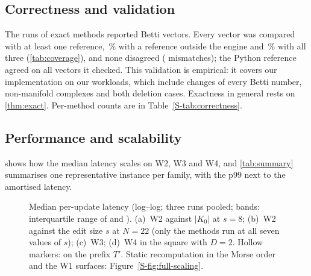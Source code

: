 \subsection{Correctness and validation}\label{sec:exp-correctness-results}

The \NumExactRuns{} runs of exact methods reported \NumCoverageVectors{} Betti
vectors. Every vector was compared with at least one reference,
\NumCoverageExternalPct\,\% with a reference outside the engine and
\NumCoverageAllThreePct\,\% with all three (\cref{tab:coverage}), and none
disagreed (\NumExactMismatches{} mismatches); the Python reference agreed on all
\NumReferenceChecks{} vectors it checked. This validation is empirical: it
covers our implementation on our workloads, which include changes of every
Betti number, non-manifold complexes and both deletion cases. Exactness in
general rests on \cref{thm:exact}. Per-method counts are in
Table~\ref{S-tab:correctness}.

\begin{table}[t]
  \centering
  \caption{Coverage of the correctness checks: Betti vectors reported by exact
    runs and the fractions compared with at least one, at least two and all
    three references (, closed form, GUDHI), and with at least
    one reference outside the engine. W4 has no closed form.}
  \label{tab:coverage}
  \small
  \setlength{\tabcolsep}{4pt}
\end{table}

\subsection{Performance and scalability}\label{sec:exp-performance}

 shows how the median latency scales on W2, W3 and W4, and
\cref{tab:summary} summarises one representative instance per family, with the
p99 next to the amortised latency.

\begin{figure}[t]
  \centering
  \caption{Median per-update latency (log--log; three runs pooled; bands:
    interquartile range of  and ). (a)~W2 against
    $|K_0|$ at $s=8$; (b)~W2 against the edit size $s$ at $N=22$ (only the
    methods run at all seven values of $s$); (c)~W3; (d)~W4 in the square with
    $D=2$. Hollow markers:  on the prefix $T'$. Static
    recomputation in the Morse order and the W1 surfaces:
    Figure~\ref{S-fig:full-scaling}.}
  \label{fig:scaling}
\end{figure}


